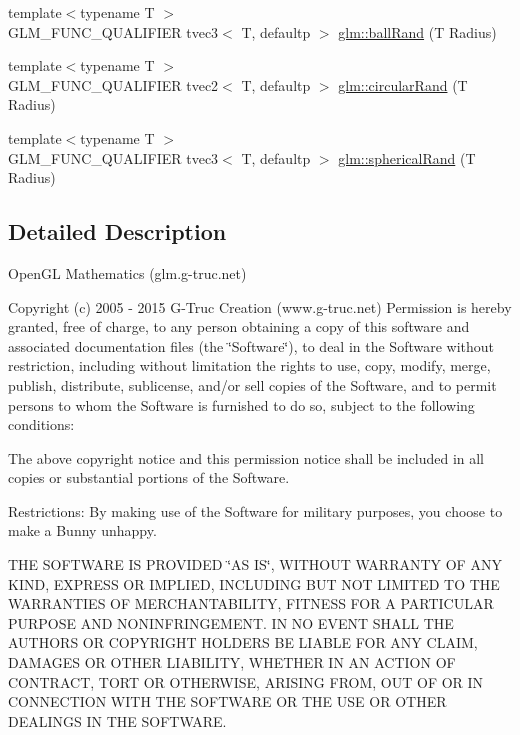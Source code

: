 \begin{DoxyCompactItemize}
{\footnotesize template$<$typename T $>$ }\\G\+L\+M\+\_\+\+F\+U\+N\+C\+\_\+\+Q\+U\+A\+L\+I\+F\+I\+E\+R tvec3$<$ T, defaultp $>$ \hyperlink{group__gtc__random_ga5506dee301160e3a06aef9b9bc7a0a83}{glm\+::ball\+Rand} (T Radius)
\item 
{\footnotesize template$<$typename T $>$ }\\G\+L\+M\+\_\+\+F\+U\+N\+C\+\_\+\+Q\+U\+A\+L\+I\+F\+I\+E\+R tvec2$<$ T, defaultp $>$ \hyperlink{group__gtc__random_gae989c26a2899b2fb7444abe7c275c29c}{glm\+::circular\+Rand} (T Radius)
\item 
{\footnotesize template$<$typename T $>$ }\\G\+L\+M\+\_\+\+F\+U\+N\+C\+\_\+\+Q\+U\+A\+L\+I\+F\+I\+E\+R tvec3$<$ T, defaultp $>$ \hyperlink{group__gtc__random_gaa9a6fc2d7a295b3857f7db23b1053d9d}{glm\+::spherical\+Rand} (T Radius)
\end{DoxyCompactItemize}


\subsection{Detailed Description}
Open\+G\+L Mathematics (glm.\+g-\/truc.\+net)

Copyright (c) 2005 -\/ 2015 G-\/\+Truc Creation (www.\+g-\/truc.\+net) Permission is hereby granted, free of charge, to any person obtaining a copy of this software and associated documentation files (the \char`\"{}\+Software\char`\"{}), to deal in the Software without restriction, including without limitation the rights to use, copy, modify, merge, publish, distribute, sublicense, and/or sell copies of the Software, and to permit persons to whom the Software is furnished to do so, subject to the following conditions\+:

The above copyright notice and this permission notice shall be included in all copies or substantial portions of the Software.

Restrictions\+: By making use of the Software for military purposes, you choose to make a Bunny unhappy.

T\+H\+E S\+O\+F\+T\+W\+A\+R\+E I\+S P\+R\+O\+V\+I\+D\+E\+D \char`\"{}\+A\+S I\+S\char`\"{}, W\+I\+T\+H\+O\+U\+T W\+A\+R\+R\+A\+N\+T\+Y O\+F A\+N\+Y K\+I\+N\+D, E\+X\+P\+R\+E\+S\+S O\+R I\+M\+P\+L\+I\+E\+D, I\+N\+C\+L\+U\+D\+I\+N\+G B\+U\+T N\+O\+T L\+I\+M\+I\+T\+E\+D T\+O T\+H\+E W\+A\+R\+R\+A\+N\+T\+I\+E\+S O\+F M\+E\+R\+C\+H\+A\+N\+T\+A\+B\+I\+L\+I\+T\+Y, F\+I\+T\+N\+E\+S\+S F\+O\+R A P\+A\+R\+T\+I\+C\+U\+L\+A\+R P\+U\+R\+P\+O\+S\+E A\+N\+D N\+O\+N\+I\+N\+F\+R\+I\+N\+G\+E\+M\+E\+N\+T. I\+N N\+O E\+V\+E\+N\+T S\+H\+A\+L\+L T\+H\+E A\+U\+T\+H\+O\+R\+S O\+R C\+O\+P\+Y\+R\+I\+G\+H\+T H\+O\+L\+D\+E\+R\+S B\+E L\+I\+A\+B\+L\+E F\+O\+R A\+N\+Y C\+L\+A\+I\+M, D\+A\+M\+A\+G\+E\+S O\+R O\+T\+H\+E\+R L\+I\+A\+B\+I\+L\+I\+T\+Y, W\+H\+E\+T\+H\+E\+R I\+N A\+N A\+C\+T\+I\+O\+N O\+F C\+O\+N\+T\+R\+A\+C\+T, T\+O\+R\+T O\+R O\+T\+H\+E\+R\+W\+I\+S\+E, A\+R\+I\+S\+I\+N\+G F\+R\+O\+M, O\+U\+T O\+F O\+R I\+N C\+O\+N\+N\+E\+C\+T\+I\+O\+N W\+I\+T\+H T\+H\+E S\+O\+F\+T\+W\+A\+R\+E O\+R T\+H\+E U\+S\+E O\+R O\+T\+H\+E\+R D\+E\+A\+L\+I\+N\+G\+S I\+N T\+H\+E S\+O\+F\+T\+W\+A\+R\+E.

